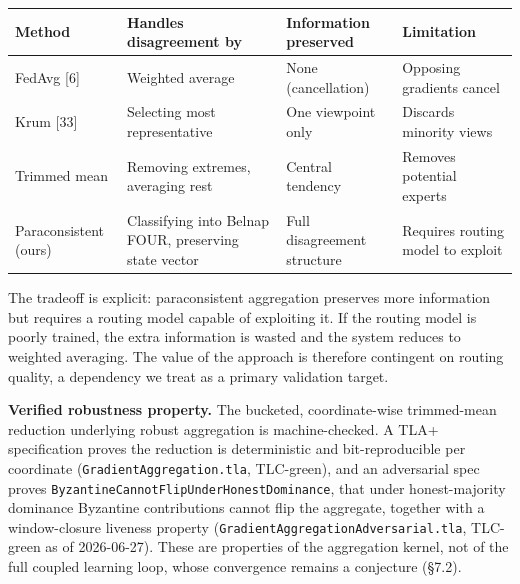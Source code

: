 {\def\LTcaptype{none} %
\begin{longtable}[]{@{}
  >{\raggedright\arraybackslash}p{}
  >{\raggedright\arraybackslash}p{}
  >{\raggedright\arraybackslash}p{}
  >{\raggedright\arraybackslash}p{}@{}}
\toprule\noalign{}
\begin{minipage}[b]{\linewidth}\raggedright
Method
\end{minipage} & \begin{minipage}[b]{\linewidth}\raggedright
Handles disagreement by
\end{minipage} & \begin{minipage}[b]{\linewidth}\raggedright
Information preserved
\end{minipage} & \begin{minipage}[b]{\linewidth}\raggedright
Limitation
\end{minipage} \\
\midrule\noalign{}
\endhead
\bottomrule\noalign{}
\endlastfoot
FedAvg {[}6{]} & Weighted average & None (cancellation) & Opposing
gradients cancel \\
Krum {[}33{]} & Selecting most representative & One viewpoint only &
Discards minority views \\
Trimmed mean & Removing extremes, averaging rest & Central tendency &
Removes potential experts \\
Paraconsistent (ours) & Classifying into Belnap FOUR, preserving state
vector & Full disagreement structure & Requires routing model to
exploit \\
\end{longtable}
}

The tradeoff is explicit: paraconsistent aggregation preserves more
information but requires a routing model capable of exploiting it. If
the routing model is poorly trained, the extra information is wasted and
the system reduces to weighted averaging. The value of the approach is
therefore contingent on routing quality, a dependency we treat as a
primary validation target.

\textbf{Verified robustness property.} The bucketed, coordinate-wise
trimmed-mean reduction underlying robust aggregation is machine-checked.
A TLA+ specification proves the reduction is deterministic and
bit-reproducible per coordinate (\texttt{GradientAggregation.tla},
TLC-green), and an adversarial spec proves
\texttt{ByzantineCannotFlipUnderHonestDominance}, that under
honest-majority dominance Byzantine contributions cannot flip the
aggregate, together with a window-closure liveness property
(\texttt{GradientAggregationAdversarial.tla}, TLC-green as of
2026-06-27). These are properties of the aggregation kernel, not of the
full coupled learning loop, whose convergence remains a conjecture
(§7.2).

